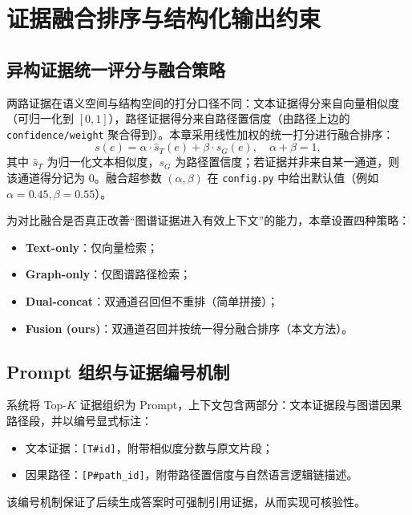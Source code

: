 \section{证据融合排序与结构化输出约束}
\label{sec:fusion_and_control}

\subsection{异构证据统一评分与融合策略}
\label{subsec:fusion}

两路证据在语义空间与结构空间的打分口径不同：文本证据得分来自向量相似度（可归一化到 $[0,1]$），路径证据得分来自路径置信度（由路径上边的 \texttt{confidence/weight} 聚合得到）。本章采用线性加权的统一打分进行融合排序：
\begin{equation}
  s(e)=\alpha\cdot \hat{s}_T(e) + \beta\cdot s_G(e),\quad \alpha+\beta=1,
\end{equation}
其中 $\hat{s}_T$ 为归一化文本相似度，$s_G$ 为路径置信度；若证据并非来自某一通道，则该通道得分记为 0。融合超参数 $(\alpha,\beta)$ 在 \texttt{config.py} 中给出默认值（例如 $\alpha=0.45, \beta=0.55$）。

为对比融合是否真正改善“图谱证据进入有效上下文”的能力，本章设置四种策略：
\begin{itemize}
  \item \textbf{Text-only}：仅向量检索；
  \item \textbf{Graph-only}：仅图谱路径检索；
  \item \textbf{Dual-concat}：双通道召回但不重排（简单拼接）；
  \item \textbf{Fusion (ours)}：双通道召回并按统一得分融合排序（本文方法）。
\end{itemize}

\subsection{Prompt 组织与证据编号机制}
\label{subsec:prompt}

系统将 Top-$K$ 证据组织为 Prompt，上下文包含两部分：文本证据段与图谱因果路径段，并以编号显式标注：
\begin{itemize}
  \item 文本证据：\texttt{[T\#id]}，附带相似度分数与原文片段；
  \item 因果路径：\texttt{[P\#path\_id]}，附带路径置信度与自然语言逻辑链描述。
\end{itemize}

该编号机制保证了后续生成答案时可强制引用证据，从而实现可核验性。

